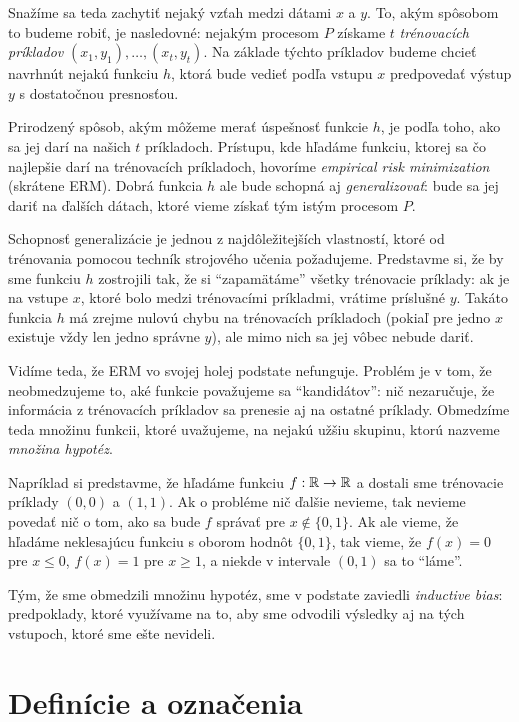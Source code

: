 Snažíme sa teda zachytiť nejaký vzťah medzi dátami $x$ a $y$. To, akým
spôsobom to budeme robiť, je nasledovné: nejakým procesom $P$ získame $t$
\emph{trénovacích príkladov} $(x_1, y_1), \ldots, (x_t, y_t)$. Na základe
týchto príkladov budeme chcieť navrhnút nejakú funkciu $h$, ktorá bude
vedieť podľa vstupu $x$ predpovedať výstup $y$ s dostatočnou presnosťou.

Prirodzený spôsob, akým môžeme merať úspešnosť funkcie $h$, je podľa
toho, ako sa jej darí na našich $t$ príkladoch. Prístupu, kde hľadáme
funkciu, ktorej sa čo najlepšie darí na trénovacích príkladoch, hovoríme
\emph{empirical risk minimization} (skrátene ERM). Dobrá funkcia $h$ ale
bude schopná aj \emph{generalizovať}: bude sa jej dariť na ďalších
dátach, ktoré vieme získať tým istým procesom $P$.

Schopnosť generalizácie je jednou z najdôležitejších vlastností, ktoré
od trénovania pomocou techník strojového učenia požadujeme. Predstavme si,
že by sme funkciu $h$ zostrojili tak, že si ``zapamätáme'' všetky trénovacie
príklady: ak je na vstupe $x$, ktoré bolo medzi trénovacími príkladmi,
vrátime príslušné $y$. Takáto funkcia $h$ má zrejme nulovú chybu na
trénovacích príkladoch (pokiaľ pre jedno $x$ existuje vždy len
jedno správne $y$), ale mimo nich sa jej vôbec nebude dariť.

Vidíme teda, že ERM vo svojej holej podstate nefunguje. Problém je v tom,
že neobmedzujeme to, aké funkcie považujeme sa ``kandidátov'': nič
nezaručuje, že informácia z trénovacích príkladov sa prenesie aj na
ostatné príklady. Obmedzíme teda množinu funkcii, ktoré uvažujeme,
na nejakú užšiu skupinu, ktorú nazveme \emph{množina hypotéz}.

Napríklad si predstavme, že hľadáme funkciu $f : \mathbb{R} \to \mathbb{R}$ a dostali
sme trénovacie príklady $(0, 0)$ a $(1, 1)$. Ak o probléme nič ďalšie
nevieme, tak nevieme povedať nič o tom, ako sa bude $f$ správať pre
$x \not\in \{0, 1\}$. Ak ale vieme, že hľadáme neklesajúcu funkciu
s oborom hodnôt $\{0, 1\}$, tak vieme, že $f(x) = 0$ pre $x \leq 0$,
$f(x) = 1$ pre $x \geq 1$, a niekde v intervale $(0, 1)$ sa to ``láme''.

Tým, že sme obmedzili množinu hypotéz, sme v podstate zaviedli
\emph{inductive bias}: predpoklady, ktoré využívame na to, aby
sme odvodili výsledky aj na tých vstupoch, ktoré sme ešte nevideli.




\section{Definície a označenia}

